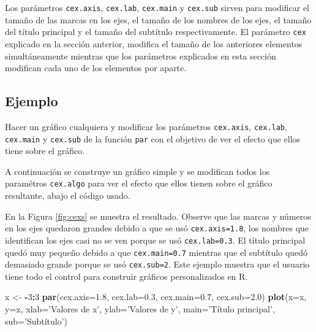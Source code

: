 \documentclass[10pt,]{krantz}
\makeatletter
\newenvironment{Shaded}{\begin{snugshade}}{\end{snugshade}}
\newcommand{\KeywordTok}[1]{\textcolor[rgb]{0.13,0.29,0.53}{\textbf{#1}}}
\newcommand{\DataTypeTok}[1]{\textcolor[rgb]{0.13,0.29,0.53}{#1}}
\newcommand{\DecValTok}[1]{\textcolor[rgb]{0.00,0.00,0.81}{#1}}
\newcommand{\FloatTok}[1]{\textcolor[rgb]{0.00,0.00,0.81}{#1}}
\newcommand{\StringTok}[1]{\textcolor[rgb]{0.31,0.60,0.02}{#1}}
\newcommand{\OperatorTok}[1]{\textcolor[rgb]{0.81,0.36,0.00}{\textbf{#1}}}
\newcommand{\NormalTok}[1]{#1}
\let\proglang=\textsf
\newenvironment{kframe}{%
\medskip{}
\setlength{\fboxsep}{.8em}
 \def\at@end@of@kframe{}%
 \ifinner\ifhmode%
  \def\at@end@of@kframe{\end{minipage}}%
  \begin{minipage}{\columnwidth}%
 \fi\fi%
 \def\FrameCommand##1{\hskip\@totalleftmargin \hskip-\fboxsep
 \colorbox{shadecolor}{##1}\hskip-\fboxsep
     \hskip-\linewidth \hskip-\@totalleftmargin \hskip\columnwidth}%
 \MakeFramed {\advance\hsize-\width
   \@totalleftmargin\z@ \linewidth\hsize
   \@setminipage}}%
 {\par\unskip\endMakeFramed%
 \at@end@of@kframe}
\renewenvironment{Shaded}{\begin{kframe}}{\end{kframe}}
\makeatother
\begin{document}
Los parámetros \texttt{cex.axis}, \texttt{cex.lab}, \texttt{cex.main} y
\texttt{cex.sub} sirven para modificar el tamaño de las marcas en los
ejes, el tamaño de los nombres de los ejes, el tamaño del título
principal y el tamaño del subtítulo respectivamente. El parámetro
\texttt{cex} explicado en la sección anterior, modifica el tamaño de los
anteriores elementos simultáneamente mientras que los parámetros
explicados en esta sección modifican cada uno de los elementos por
aparte.

\subsection*{Ejemplo}\label{ejemplo-39}


Hacer un gráfico cualquiera y modificar los parámetros
\texttt{cex.axis}, \texttt{cex.lab}, \texttt{cex.main} y
\texttt{cex.sub} de la función \texttt{par} con el objetivo de ver el
efecto que ellos tiene sobre el gráfico.

A continuación se construye un gráfico simple y se modifican todos los
paramétros \texttt{cex.algo} para ver el efecto que ellos tienen sobre
el gráfico resultante, abajo el código usado.

En la Figura \ref{fig:cexs} se muestra el resultado. Observe que las
marcas y números en los ejes quedaron grandes debido a que se usó
\texttt{cex.axis=1.8}, los nombres que identifican los ejes casi no se
ven porque se usó \texttt{cex.lab=0.3}. El título principal quedó muy
pequeño debido a que \texttt{cex.main=0.7} mientras que el subtítulo
quedó demasiado grande porque se usó \texttt{cex.sub=2}. Este ejemplo
muestra que el usuario tiene todo el control para construir gráficos
personalizados en \proglang{R}.

\begin{Shaded}
\begin{Highlighting}[]
\NormalTok{x <-}\StringTok{ }\OperatorTok{-}\DecValTok{3}\OperatorTok{:}\DecValTok{3}
\KeywordTok{par}\NormalTok{(}\DataTypeTok{cex.axis=}\FloatTok{1.8}\NormalTok{, }\DataTypeTok{cex.lab=}\FloatTok{0.3}\NormalTok{, }\DataTypeTok{cex.main=}\FloatTok{0.7}\NormalTok{, }\DataTypeTok{cex.sub=}\FloatTok{2.0}\NormalTok{)}
\KeywordTok{plot}\NormalTok{(}\DataTypeTok{x=}\NormalTok{x, }\DataTypeTok{y=}\NormalTok{x,}
     \DataTypeTok{xlab=}\StringTok{'Valores de x'}\NormalTok{, }\DataTypeTok{ylab=}\StringTok{'Valores de y'}\NormalTok{,}
     \DataTypeTok{main=}\StringTok{'Título principal'}\NormalTok{,}
     \DataTypeTok{sub=}\StringTok{'Subtítulo'}\NormalTok{)}
\end{Highlighting}
\end{Shaded}
\end{document}
